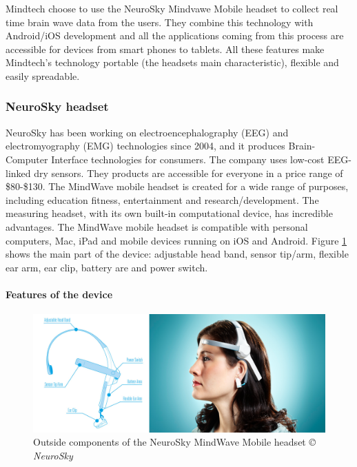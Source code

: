 \documentclass[letterpaper,10pt]{article}
\begin{document}
Mindtech choose to use the NeuroSky Mindvawe Mobile headset to collect real time brain wave data from the users. They combine this technology with Android/iOS development and all the applications coming from this process are accessible for devices from smart phones to tablets. All these features make Mindtech's technology portable (the headsets main characteristic), flexible and easily spreadable.


\subsubsection{NeuroSky headset}

NeuroSky has been working on electroencephalography (EEG) and electromyography (EMG) technologies since 2004, and it produces Brain-Computer Interface technologies for consumers. The company uses low-cost EEG-linked dry sensors. They products are accessible for everyone in a price range of \$80-\$130. The MindWave mobile headset is created for a wide range of purposes, including education fitness, entertainment  and research/development. \cite{wearable} The measuring headset, with its own built-in computational device, has incredible advantages. The MindWave mobile headset is compatible with personal computers, Mac, iPad and mobile devices running on iOS and Android. \cite{neurosky} Figure \ref{fig:headsetcomponents} shows the main part of the device: adjustable head band, sensor tip/arm, flexible ear arm, ear clip, battery are and power switch.

\paragraph{Features of the device}

\begin{figure}[h]
\centering
\includegraphics[scale=0.5]{mindwave.png}
\caption[Outside components of the NeuroSky MindWave Mobile headset]{Outside components of the NeuroSky MindWave Mobile headset \textit{© NeuroSky}}
\label{fig:headsetcomponents}
\end{figure}
\end{document}
